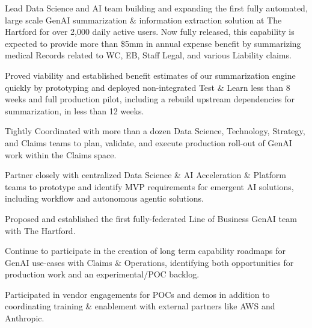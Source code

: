 \documentclass[letterpaper]{deedy-resume} %
\begin{document}
\begin{minipage}[t]{0.68\textwidth}
  \hfill
  \hfill
  \vspace{\topsep}
  \begin{tightitemize}
    \item Lead Data Science and AI team building and expanding the first fully automated, large scale GenAI summarization \&
      information extraction solution at The Hartford for over 2,000 daily active users. 
      Now fully released, this capability is expected to provide more than \$5mm in annual expense benefit 
      by summarizing medical Records related to WC, EB, Staff Legal, and various Liability claims.
    \item Proved viability and established benefit estimates of our summarization engine quickly by prototyping and 
      deployed non-integrated Test \& Learn less than 8 weeks and full production pilot, including a rebuild upstream dependencies for summarization, 
      in less than 12 weeks.
    \item Tightly Coordinated with more than a dozen Data Science, Technology, Strategy, and Claims teams
      to plan, validate, and execute production roll-out of GenAI work within the Claims space.
    \item Partner closely with centralized Data Science \& AI Acceleration \& Platform teams to prototype and
    identify MVP requirements for emergent AI solutions, including workflow and autonomous agentic solutions.
    \item Proposed and established the first fully-federated Line of Business GenAI team with The Hartford.
    \item Continue to participate in the creation of long term capability roadmaps for GenAI 
      use-cases with Claims \& Operations, identifying both opportunities for production 
      work and an experimental/POC backlog.
    \item Participated in vendor engagements for POCs and demos in addition to coordinating
      training \& enablement with external partners like AWS and Anthropic.
  \end{tightitemize}
  \sectionspace
  

\end{minipage}
\end{document}
